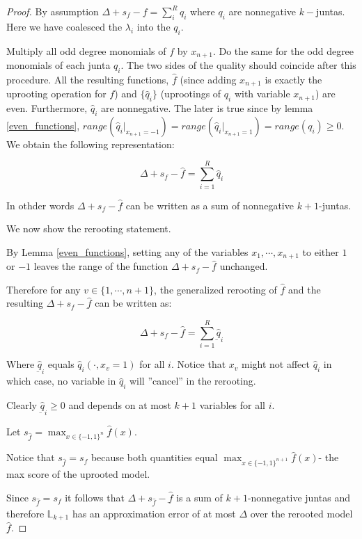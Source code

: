 \begin{proof}
By assumption $\Delta + s_f - f = \sum_{i}^R q_i$ where $q_i$ are nonnegative $k-$juntas. Here we have coalesced the $\lambda_i$ into the $q_i$.

Multiply all odd degree monomials of $f$ by $x_{n+1}$. Do the same for the odd degree monomials of each junta $q_i$. The two sides of the quality should coincide after this procedure. All the resulting functions, $\hat{f}$ (since adding $x_{n+1}$ is exactly the uprooting operation for $f$) and $\{\hat{q}_i\}$ (uprootings of $q_i$ with variable $x_{n+1}$) are even. Furthermore, $\hat{q}_i$ are nonnegative. The later is true since by lemma \ref{even_functions}, $range(\hat{q}_i|_{x_{n+1} = -1}) = range(\hat{q}_i|_{x_{n+1} = 1}) = range(q_i) \geq 0$. We obtain the following representation:

\begin{equation}
\Delta + s_f - \hat{f} = \sum_{i=1}^R \hat{q}_i
\end{equation}

In othder words $\Delta + s_f - \hat{f}$ can be written as a sum of nonnegative $k+1$-juntas.

We now show the rerooting statement.

By Lemma \ref{even_functions}, setting any of the variables $x_1, \cdots, x_{n+1}$ to either $1$ or $-1$ leaves the range of the function $\Delta + s_f - \hat{f}$ unchanged. 

Therefore for any $v \in \{1, \cdots, n+1\}$, the generalized rerooting of $\hat{f}$ and the resulting $\Delta + s_f - {\hat{\underbar{f}}}$ can be written as:   

\begin{equation}
\Delta + s_f - \hat{\underbar{f}} = \sum_{i=1}^R \hat{\underbar{q}}_i
\end{equation}

Where $\hat{\underbar{q}}_i$ equals $\hat{q}_i( \cdot, x_v= 1)$ for all $i$. Notice that $x_v$ might not affect $\hat{q}_i$ in which case, no variable in $\hat{q}_i$ will ''cancel'' in the rerooting.

Clearly $\hat{\underbar{q}}_i \geq 0$ and depends on at most $k+1$ variables for all $i$.

Let $s_{\hat{\underbar{f}}} = \max_{x  \in \{-1,1\}^{n} } \hat{\underbar{f}}(x)$. 

Notice that $s_{\hat{\underbar{f}}} = s_f$ because both quantities equal $\max_{x \in\{-1,1\}^{n+1}} \hat{f}(x)$- the max score of the uprooted model. 

Since $s_{\hat{\underbar{f}}} = s_f$ it follows that $\Delta + s_{\hat{\underbar{f}}} - \hat{\underbar{f}}$ is a sum of $k+1$-nonnegative juntas and therefore $\mathbb{L}_{k+1}$ has an approximation error of at most $\Delta$ over the rerooted model $\hat{\underbar{f}}$.

\end{proof}




